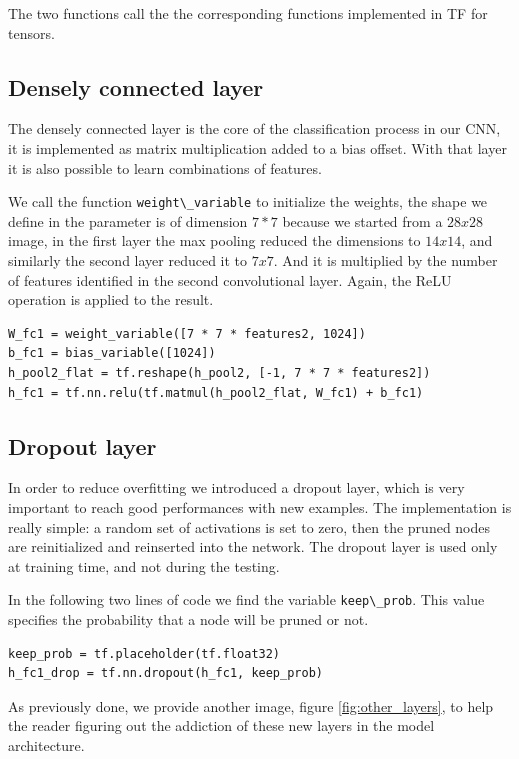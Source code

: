 The two functions call the the corresponding functions implemented in \acs{TF} for tensors.

\subsection{Densely connected layer}

The densely connected layer is the core of the classification process in our \acs{CNN}, it is implemented as matrix multiplication added to a bias offset. With that layer it is also possible to learn combinations of features.

We call the function \lstinline|weight\_variable| to initialize the weights, the shape we define in the parameter is of dimension $7*7$ because we started from a $28x28$ image, in the first layer the max pooling reduced the dimensions to $14x14$, and similarly the second layer reduced it to $7x7$. And it is multiplied by the number of features identified in the second convolutional layer.
Again, the \acs{ReLU} operation is applied to the result.

\begin{lstlisting}
W_fc1 = weight_variable([7 * 7 * features2, 1024])
b_fc1 = bias_variable([1024])
h_pool2_flat = tf.reshape(h_pool2, [-1, 7 * 7 * features2])
h_fc1 = tf.nn.relu(tf.matmul(h_pool2_flat, W_fc1) + b_fc1)
\end{lstlisting}

\subsection{Dropout layer}

In order to reduce overfitting we introduced a dropout layer, which is very important to reach good performances with new examples. The implementation is really simple: a random set of activations is set to zero, then the pruned nodes are reinitialized and reinserted into the network. The dropout layer is used only at training time, and not during the testing.

In the following two lines of code we find the variable \lstinline|keep\_prob|. This value specifies the probability that a node will be pruned or not.

\begin{lstlisting}
keep_prob = tf.placeholder(tf.float32)
h_fc1_drop = tf.nn.dropout(h_fc1, keep_prob)
\end{lstlisting}

As previously done, we provide another image, figure \ref{fig:other_layers}, to help the reader figuring out the addiction of these new layers in the model architecture.

